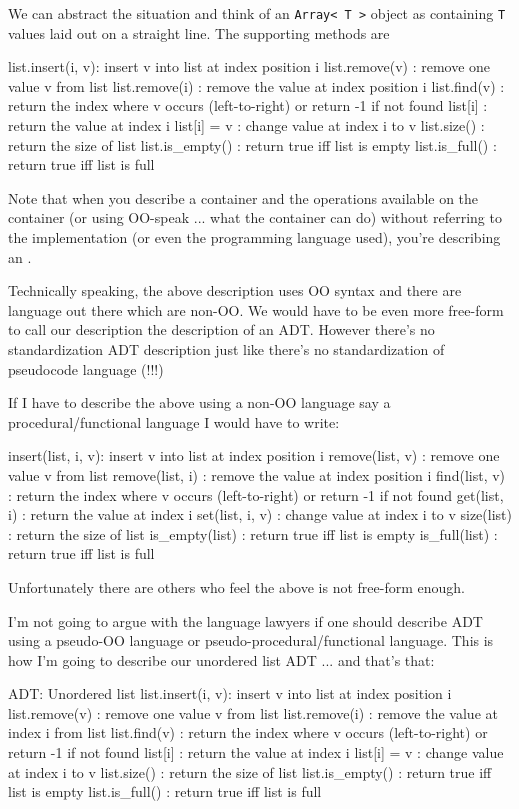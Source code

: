 We can abstract the situation and think of an \verb!Array< T >!
object as containing \verb!T! values laid out on a straight line.
The supporting methods are
\begin{console}[fontsize=\footnotesize]
list.insert(i, v): insert v into list at index position i
list.remove(v)   : remove one value v from list
list.remove(i)   : remove the value at index position i
list.find(v)     : return the index where v occurs (left-to-right)
                   or return -1 if not found
list[i]          : return the value at index i
list[i] = v      : change value at index i to v
list.size()      : return the size of list
list.is_empty()  : return true iff list is empty
list.is_full()   : return true iff list is full
\end{console}

Note that when you describe a container and the operations available
on the container
(or using OO-speak ... what the container can do)
without referring to the implementation (or even the programming language
used), you're describing an .

Technically speaking, the above description uses OO syntax
and there are language out there which are non-OO.
We would have to be even more free-form to call our description
the description of an ADT.
However there's no standardization ADT description
just like there's no standardization of pseudocode language (!!!)

If I have to describe the above using a non-OO language say a 
procedural/functional
language I would have to write:
\begin{console}[fontsize=\footnotesize]
insert(list, i, v): insert v into list at index position i
remove(list, v)   : remove one value v from list
remove(list, i)   : remove the value at index position i
find(list, v)     : return the index where v occurs (left-to-right)
                    or return -1 if not found
get(list, i)      : return the value at index i
set(list, i, v)   : change value at index i to v
size(list)        : return the size of list
is_empty(list)    : return true iff list is empty
is_full(list)     : return true iff list is full
\end{console}
Unfortunately there are others who feel the above is not
free-form enough.

I'm not going to argue with the language lawyers if one should
describe ADT using a pseudo-OO language or
pseudo-procedural/functional
language. This is how I'm going to describe our unordered list ADT
... and that's that:
\begin{console}[fontsize=\footnotesize]
ADT: Unordered list
list.insert(i, v): insert v into list at index position i
list.remove(v)   : remove one value v from list
list.remove(i)   : remove the value at index i from list
list.find(v)     : return the index where v occurs (left-to-right)
                   or return -1 if not found
list[i]          : return the value at index i
list[i] = v      : change value at index i to v
list.size()      : return the size of list
list.is_empty()  : return true iff list is empty
list.is_full()   : return true iff list is full
\end{console}

